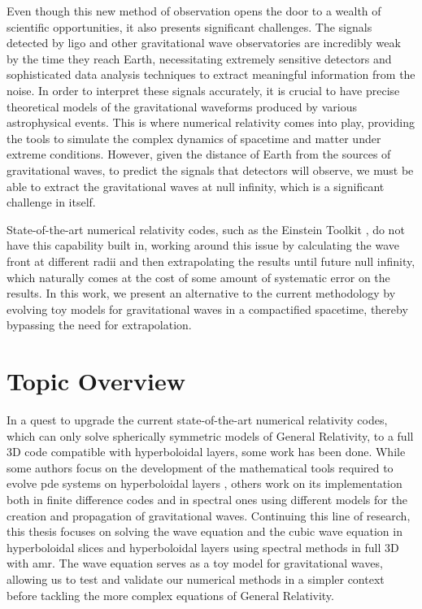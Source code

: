 Even though this new method of observation opens the door to a wealth of scientific opportunities, it also presents significant challenges. The signals detected by \acrshort{ligo} and other gravitational wave observatories are incredibly weak by the time they reach Earth, necessitating extremely sensitive detectors and sophisticated data analysis techniques to extract meaningful information from the noise. In order to interpret these signals accurately, it is crucial to have precise theoretical models of the gravitational waveforms produced by various astrophysical events. This is where numerical relativity comes into play, providing the tools to simulate the complex dynamics of spacetime and matter under extreme conditions. However, given the distance of Earth from the sources of gravitational waves, to predict the signals that detectors will observe, we must be able to extract the gravitational waves at null infinity, which is a significant challenge in itself. 

State-of-the-art numerical relativity codes, such as the Einstein Toolkit \cite{einstein_toolkit_2025}, do not have this capability built in, working around this issue by calculating the wave front at different radii and then extrapolating the results until future null infinity, which naturally comes at the cost of some amount of systematic error on the results. In this work, we present an alternative to the current methodology by evolving toy models for gravitational waves in a compactified spacetime, thereby bypassing the need for extrapolation.


\section{Topic Overview}
\label{section:overview}

In a quest to upgrade the current state-of-the-art numerical relativity codes, which can only solve spherically symmetric models of General Relativity, to a full 3D code compatible with hyperboloidal layers, some work has been done. While some authors focus on the development of the mathematical tools required to evolve \acrfull{pde} systems on hyperboloidal layers \cite{hypmath1,hypmath2,hypmath3,hypmath4,Hyperboloidal_layers_for_hyperbolic_equations_on_unbounded_domains,Dual_Foliation_Formulations_of_General_Relativity}, others work on its implementation both in finite difference codes \cite{hypfinitediff1,hypfinitediff2,hypfinitediff3,hypfinitediff4,hypfinitediff5,hypfinitediff6,hypfinitediff7} and in spectral ones \cite{The_evolution_of_hyperboloidal_data_with_the_dual_foliation_formalism_Mathematical_analysis_and_wave_equation_tests} using different models for the creation and propagation of gravitational waves. Continuing this line of research, this thesis focuses on solving the wave equation and the cubic wave equation in hyperboloidal slices and hyperboloidal layers using spectral methods in full 3D with \acrfull{amr}. The wave equation serves as a toy model for gravitational waves, allowing us to test and validate our numerical methods in a simpler context before tackling the more complex equations of General Relativity. 

